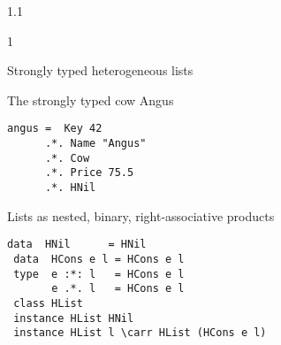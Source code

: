 \documentclass{slides}
\newenvironment{myslide}{\begin{slide}\color{Blue}\begin{boxedminipage}{1.1\hsize}\begin{boxedminipage}{1\hsize}\color{Black}
\vspace{-170\in}
}{%
\smallskip
\end{boxedminipage}
\end{boxedminipage}
\end{slide}}
\newenvironment{myslide}{\begin{slide}
}{%
\end{slide}}
\newenvironment{myslide}{\begin{slide}\color{White}\begin{boxedminipage}{1.1\hsize}\color{Black}
\vspace{-170\in}
}{%
\smallskip
\end{boxedminipage}
\end{slide}}
\newcommand{\header}[1]{{\large \color{Red} #1}}
\newcommand{\blau}[1]{{\vspace{-50\in}\normalsize \color{Blue} #1}}
\newcommand{\carr}{\ensuremath{\Rightarrow}}
\begin{document}



\begin{myslide}

\header{Strongly typed heterogeneous lists}

\vspace{-66\in}

\blau{The strongly typed cow Angus}

\medskip

\begin{Verbatim}[fontfamily=courier,fontsize=\small,commandchars=\\\{\}]
 angus =  Key 42
      .*. Name "Angus"
      .*. Cow
      .*. Price 75.5
      .*. HNil
\end{Verbatim}

\vspace{-66\in}

\blau{Lists as nested, binary, right-associative products}

\medskip

\begin{Verbatim}[fontfamily=courier,fontsize=\small,commandchars=\\\{\}]
 data  HNil      = HNil
 data  HCons e l = HCons e l
 type  e :*: l   = HCons e l
       e .*. l   = HCons e l
 class HList
 instance HList HNil
 instance HList l \carr HList (HCons e l)
\end{Verbatim}

\end{myslide}



\end{document}
